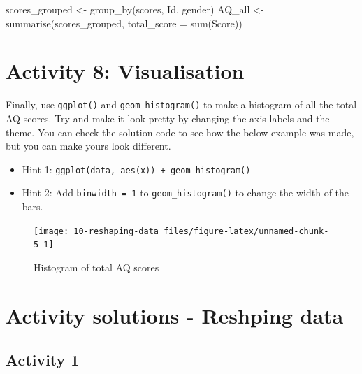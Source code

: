 \documentclass[
  oneside]{book}
\newenvironment{Shaded}{\begin{snugshade}}{\end{snugshade}}
\newcommand{\AttributeTok}[1]{\textcolor[rgb]{0.77,0.63,0.00}{#1}}
\newcommand{\FunctionTok}[1]{\textcolor[rgb]{0.00,0.00,0.00}{#1}}
\newcommand{\NormalTok}[1]{#1}
\newcommand{\OtherTok}[1]{\textcolor[rgb]{0.56,0.35,0.01}{#1}}
\providecommand{\tightlist}{%
  \setlength{\itemsep}{0pt}\setlength{\parskip}{0pt}}
\begin{document}
\begin{Shaded}
\begin{Highlighting}[]
\NormalTok{scores\_grouped }\OtherTok{\textless{}{-}} \FunctionTok{group\_by}\NormalTok{(scores, Id, gender)}
\NormalTok{AQ\_all }\OtherTok{\textless{}{-}} \FunctionTok{summarise}\NormalTok{(scores\_grouped, }\AttributeTok{total\_score =} \FunctionTok{sum}\NormalTok{(Score))}
\end{Highlighting}
\end{Shaded}

\hypertarget{activity-8-visualisation}{%
\section{Activity 8: Visualisation}\label{activity-8-visualisation}}

Finally, use \texttt{ggplot()} and \texttt{geom\_histogram()} to make a histogram of all the total AQ scores. Try and make it look pretty by changing the axis labels and the theme. You can check the solution code to see how the below example was made, but you can make yours look different.

\begin{itemize}
\tightlist
\item
  Hint 1: \texttt{ggplot(data,\ aes(x))\ +\ geom\_histogram()}
\item
  Hint 2: Add \texttt{binwidth\ =\ 1} to \texttt{geom\_histogram()} to change the width of the bars.
\end{itemize}

\begin{figure}

{\centering \texttt{[image: 10-reshaping-data\_files/figure-latex/unnamed-chunk-5-1]} 

}

\caption{Histogram of total AQ scores}\label{fig:unnamed-chunk-5}
\end{figure}

\hypertarget{activity-solutions---reshping-data}{%
\section{Activity solutions - Reshping data}\label{activity-solutions---reshping-data}}

\hypertarget{activity-1-3}{%
\subsection{Activity 1}\label{activity-1-3}}
\end{document}
